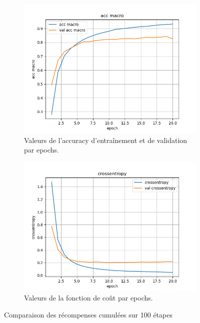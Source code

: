 \documentclass[a4paper]{article}
\begin{document}
\begin{figure}[H]
    \centering
    \begin{subfigure}{0.45\textwidth}
        \centering
        \includegraphics[width=\linewidth]{../logs/get_pos_French_2/acc macro.png}
        \caption{Valeurs de l'accuracy d'entraînement et de validation par epochs.}
    \end{subfigure}
    \hfill
    \begin{subfigure}{0.45\textwidth}
        \centering
        \includegraphics[width=\linewidth]{../logs/get_pos_French_2/crossentropy.png}
        \caption{Valeurs de la fonction de coût par epochs.}
    \end{subfigure}
    \caption{Comparaison des récompenses cumulées sur 100 étapes}
\end{figure}
\end{document}
